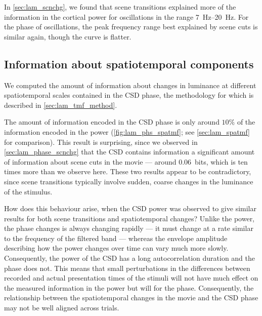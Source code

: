 In \autoref{sec:lam_scnchg}, we found that scene transitions explained more of the information in the cortical power for oscillations in the range \SIrange{7}{20}{Hz}.
For the phase of oscillations, the peak frequency range best explained by scene cuts is similar again, though the curve is flatter.


\subsection{Information about spatiotemporal components}

We computed the amount of information about changes in luminance at different spatiotemporal scales contained in the \ac{CSD} phase, the methodology for which is described in \autoref{sec:lam_tmf_method}.

The amount of information encoded in the \ac{CSD} phase is only around $10\%$ of the information encoded in the power (\autoref{fig:lam_phs_spatmf}; see \autoref{sec:lam_spatmf} for comparison).
This result is surprising, since we observed in \autoref{sec:lam_phase_scnchg} that the \ac{CSD} contains information a significant amount of information about scene cuts in the movie --- around \SI{0.06}{bits}, which is ten times more than we observe here.
These two results appear to be contradictory, since scene transitions typically involve sudden, coarse changes in the luminance of the stimulus.

How does this behaviour arise, when the \ac{CSD} power was observed to give similar results for both scene transitions and spatiotemporal changes?
Unlike the power, the phase changes is always changing rapidly --- it must change at a rate similar to the frequency of the filtered band --- whereas the envelope amplitude describing how the power changes over time can vary much more slowly.
Consequently, the power of the \ac{CSD} has a long autocorrelation duration and the phase does not.
This means that small perturbations in the differences between recorded and actual presentation times of the stimuli will not have much effect on the measured information in the power but will for the phase.
Consequently, the relationship between the spatiotemporal changes in the movie and the \ac{CSD} phase may not be well aligned across trials.


